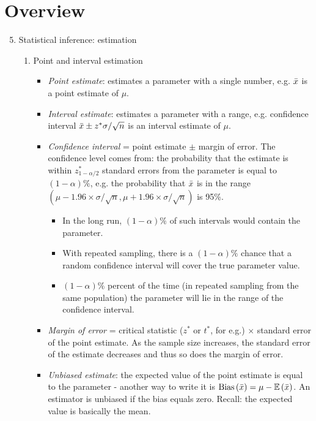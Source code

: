 \section{Overview}
\begin{enumerate}[label=\textbf{\S~\arabic*}, ref=\S~\arabic*]
\setcounter{enumi}{4}
    \item Statistical inference: estimation
    \begin{enumerate}[label=\textbf{\S~5.\arabic*}, ref=\S~5.\arabic*]
        \item Point and interval estimation
        \begin{itemize}
            \item \textit{Point estimate}: estimates a parameter with a single number, e.g. $\Bar{x}$ is a point estimate of $\mu$.
            \item \textit{Interval estimate}: estimates a parameter with a range, e.g. confidence interval $\Bar{x} \pm z^* \sigma/\sqrt{n}$ is an interval estimate of $\mu$. 
            \item \textit{Confidence interval} = point estimate $\pm$ margin of error. The confidence level comes from: the probability that the estimate is within $z^*_{1 - \alpha/2}$ standard errors from the parameter is equal to $(1-\alpha)\%$, e.g. the probability that $\Bar{x}$ is in the range $(\mu - 1.96 \times \sigma/\sqrt{n}, \mu+ 1.96 \times \sigma/\sqrt{n})$ is 95\%. 
            \begin{itemize}
                \item In the long run, $(1-\alpha)\%$ of such intervals would contain the parameter.
                \item With repeated sampling, there is a $(1-\alpha)\%$ chance that a random confidence interval will cover the true parameter value. 
                \item $(1-\alpha)\%$ percent of the time (in repeated sampling from the same population) the parameter will lie in the range of the confidence interval.
            \end{itemize}
            \item \textit{Margin of error} = critical statistic ($z^*$ or $t^*$, for e.g.) $\times$ standard error of the point estimate. As the sample size increases, the standard error of the estimate decreases and thus so does the margin of error.
            \item \textit{Unbiased estimate}: the expected value of the point estimate is equal to the parameter - another way to write it is $\text{Bias}\left( \Bar{x}\right) = \mu - \operatorname{\mathbb{E}} \left( \Bar{x}\right)$. An estimator is unbiased if the bias equals zero. Recall: the expected value is basically the mean.

\end{itemize}
\end{enumerate}
\end{enumerate}
